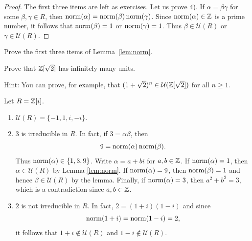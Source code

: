 \begin{proof}
  The first three items are left as exercises. Let us prove 4).  If
  $\alpha=\beta\gamma$ for some $\beta,\gamma\in R$, then
  $\operatorname{norm}(\alpha)=\operatorname{norm}(\beta)\operatorname{norm}(\gamma)$.
  Since $\operatorname{norm}(\alpha)\in\mathbb{Z}$ is a prime number, it follows that
  $\operatorname{norm}(\beta)=1$ or $\operatorname{norm}(\gamma)=1$. Thus
  $\beta\in\mathcal{U}(R)$ or $\gamma\in\mathcal{U}(R)$. 	
\end{proof}

\begin{exercise}
  Prove the first three items of Lemma~\ref{lem:norm}.
\end{exercise}

\begin{bonus}
    Prove that $\mathbb{Z}[\sqrt{2}]$ has infinitely many units. 
\end{bonus}

Hint: You can prove, for example, that $(1+\sqrt{2})^n\in\mathcal{U}(\mathbb{Z}[\sqrt{2}])$ 
for all $n\geq1$. 

\begin{example}
	Let $R=\mathbb{Z}[i]$. 
	\begin{enumerate}
		\item $\mathcal{U}(R)=\{-1,1,i,-i\}$.
		\item $3$ is irreducible in $R$. In fact, if $3=\alpha\beta$, then
			\[
            9=\operatorname{norm}(\alpha)\operatorname{norm}(\beta).
            \]
            Thus $\operatorname{norm}(\alpha)\in\{1,3,9\}$. Write
			$\alpha=a+bi$ for $a,b\in\mathbb{Z}$. If $\operatorname{norm}(\alpha)=1$, then $\alpha\in\mathcal{U}(R)$ by Lemma \ref{lem:norm}. 
			If $\operatorname{norm}(\alpha)=9$, then $\operatorname{norm}(\beta)=1$ and hence $\beta\in\mathcal{U}(R)$ by the lemma. Finally, 
			if $\operatorname{norm}(\alpha)=3$, then $a^2+b^2=3$, which is a contradiction since $a,b\in\mathbb{Z}$. 
		\item $2$ is not irreducible in $R$. In fact, $2=(1+i)(1-i)$ and
			since \[
			\operatorname{norm}(1+i)=\operatorname{norm}(1-i)=2,
			\]
			it follows that $1+i\not\in\mathcal{U}(R)$ 
			and $1-i\not\in\mathcal{U}(R)$. 
	\end{enumerate}	
\end{example}

